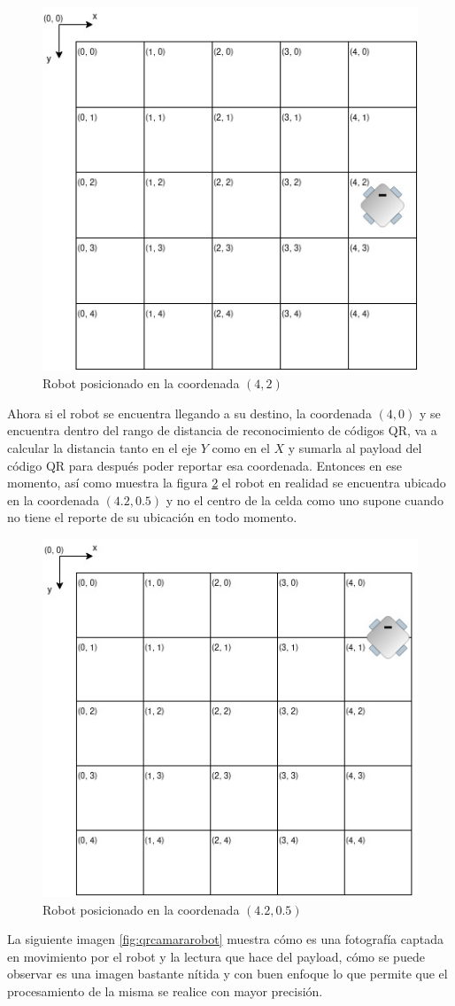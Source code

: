 \begin{figure}[H]
   \centering
   \includegraphics[width=0.5\linewidth]{images/robot_posicion_0.jpg}
   \caption{Robot posicionado en la coordenada $(4,2)$}
   \label{fig:robot_posicion_0}
\end{figure}

Ahora si el robot se encuentra llegando a su destino, la coordenada $(4,0)$ y se encuentra dentro del rango de distancia de reconocimiento de códigos QR, va a calcular la distancia tanto en el eje $Y$ como en el $X$ y sumarla al payload del código QR para después poder reportar esa coordenada. Entonces en ese momento, así como muestra la figura \ref{fig:robot_posicion_1} el robot en realidad se encuentra ubicado en la coordenada $(4.2,0.5)$ y no el centro de la celda como uno supone cuando no tiene el reporte de su ubicación en todo momento.

\begin{figure}[H]
   \centering
   \includegraphics[width=0.5\linewidth]{images/robot_posicion_1.jpg}
   \caption{Robot posicionado en la coordenada $(4.2,0.5)$}
   \label{fig:robot_posicion_1}
\end{figure}

La siguiente imagen \ref{fig:qrcamararobot} muestra cómo es una fotografía captada en movimiento por el robot y la lectura que hace del payload, cómo se puede observar es una imagen bastante nítida y con buen enfoque lo que permite que el procesamiento de la misma se realice con mayor precisión.

